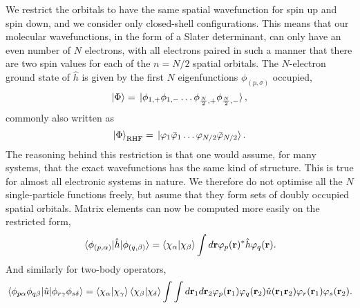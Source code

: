 We restrict the orbitals to have the same spatial wavefunction for spin up and spin
down, and we consider only closed-shell configurations. This means that our 
molecular wavefunctions, in the form of a Slater determinant, can only have an 
even number of $N$ electrons, with all electrons paired in such a manner that there 
are two spin values for each of the $n=N/2$ spatial orbitals. The $N$-electron 
ground state of $\hat{h}$ is given by the first $N$ eigenfunctions $\phi_{(p,\sigma)}$
occupied,
\begin{equation}
    \ket{\Phi} = \ket*{\phi_{1,+}\phi_{1,-}\dots \phi_{\frac{N}{2},+}\phi_{\frac{N}{2},-}},
\end{equation}
commonly also written as 
\begin{equation}
    \ket{\Phi}_{\text{RHF}} = 
    \ket*{\varphi_1 \bar{\varphi}_1 \dots \varphi_{N/2} \bar{\varphi}_{N/2}}.
\end{equation}
The reasoning behind this restriction is that one would assume, for many systems, that 
the exact wavefunctions has the same kind of structure. This is true for almost all 
electronic systems in nature. We therefore do not optimise all the $N$ single-particle 
functions freely, but asume that they form sets of doubly occupied spatial orbitals. 
Matrix elements can now be computed more easily on the restricted form,
\begin{equation}
    \mel*{\phi_{(p,\alpha)}}{\hat{h}}{\phi_{(q,\beta)}} 
    = \braket{\chi_\alpha}{\chi_\beta}
        \int d\vb{r} \varphi_p(\vb{r})^*\hat{h}\varphi_q(\vb{r}).
\end{equation}
And similarly for two-body operators,
\begin{equation}
    \mel{\phi_{p\alpha}\phi_{q\beta}}{\hat{u}}{\phi_{r\gamma}\phi_{s\delta}}
    = \braket{\chi_\alpha}{\chi_\gamma}\braket{\chi_\beta}{\chi_\delta}
        \int \int d \vb{r}_1 d \vb{r}_2 \varphi_p(\vb{r}_1)\varphi_q(\vb{r}_2)
            \hat{u}(\vb{r}_1 \vb{r}_2) \varphi_r(\vb{r}_1)\varphi_s(\vb{r}_2).
\end{equation}

